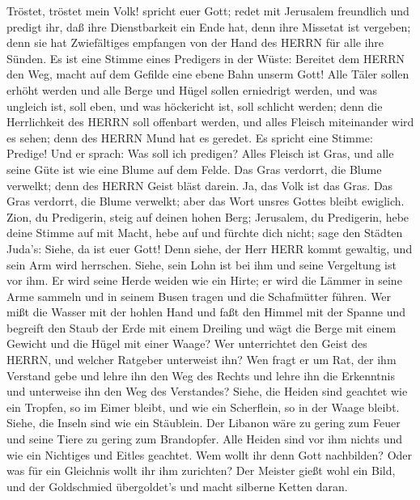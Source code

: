  Tröstet, tröstet mein Volk! spricht euer Gott; 
redet mit Jerusalem freundlich und predigt ihr, daß ihre Dienstbarkeit
ein Ende hat, denn ihre Missetat ist vergeben; denn sie hat Zwiefältiges
empfangen von der Hand des HERRN für alle ihre Sünden.  Es
ist eine Stimme eines Predigers in der Wüste: Bereitet dem HERRN den
Weg, macht auf dem Gefilde eine ebene Bahn unserm Gott! 
Alle Täler sollen erhöht werden und alle Berge und Hügel sollen
erniedrigt werden, und was ungleich ist, soll eben, und was höckericht
ist, soll schlicht werden;  denn die Herrlichkeit des HERRN
soll offenbart werden, und alles Fleisch miteinander wird es sehen; denn
des HERRN Mund hat es geredet.  Es spricht eine Stimme:
Predige! Und er sprach: Was soll ich predigen? Alles Fleisch ist Gras,
und alle seine Güte ist wie eine Blume auf dem Felde.  Das
Gras verdorrt, die Blume verwelkt; denn des HERRN Geist bläst darein.
Ja, das Volk ist das Gras.  Das Gras verdorrt, die Blume
verwelkt; aber das Wort unsres Gottes bleibt ewiglich. 
Zion, du Predigerin, steig auf deinen hohen Berg; Jerusalem, du
Predigerin, hebe deine Stimme auf mit Macht, hebe auf und fürchte dich
nicht; sage den Städten Juda's: Siehe, da ist euer Gott! 
Denn siehe, der Herr HERR kommt gewaltig, und sein Arm wird herrschen.
Siehe, sein Lohn ist bei ihm und seine Vergeltung ist vor ihm.
 Er wird seine Herde weiden wie ein Hirte; er wird die
Lämmer in seine Arme sammeln und in seinem Busen tragen und die
Schafmütter führen.  Wer mißt die Wasser mit der hohlen
Hand und faßt den Himmel mit der Spanne und begreift den Staub der Erde
mit einem Dreiling und wägt die Berge mit einem Gewicht und die Hügel
mit einer Waage?  Wer unterrichtet den Geist des HERRN, und
welcher Ratgeber unterweist ihn?  Wen fragt er um Rat, der
ihm Verstand gebe und lehre ihn den Weg des Rechts und lehre ihn die
Erkenntnis und unterweise ihn den Weg des Verstandes? 
Siehe, die Heiden sind geachtet wie ein Tropfen, so im Eimer bleibt, und
wie ein Scherflein, so in der Waage bleibt. Siehe, die Inseln sind wie
ein Stäublein.  Der Libanon wäre zu gering zum Feuer und
seine Tiere zu gering zum Brandopfer.  Alle Heiden sind vor
ihm nichts und wie ein Nichtiges und Eitles geachtet.  Wem
wollt ihr denn Gott nachbilden? Oder was für ein Gleichnis wollt ihr ihm
zurichten?  Der Meister gießt wohl ein Bild, und der
Goldschmied übergoldet's und macht silberne Ketten daran. 
